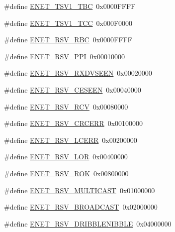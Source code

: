 \begin{DoxyCompactItemize}
\item 
\#define \hyperlink{group___e_n_e_t__17_x_x__40_x_x_ga85659c24bcb857d841bc18e037ee3a78}{E\+N\+E\+T\+\_\+\+T\+S\+V1\+\_\+\+T\+B\+C}~0x0000\+F\+F\+F\+F
\item 
\#define \hyperlink{group___e_n_e_t__17_x_x__40_x_x_ga9a2d8f8be313560a8d1858f623d5d599}{E\+N\+E\+T\+\_\+\+T\+S\+V1\+\_\+\+T\+C\+C}~0x000\+F0000
\item 
\#define \hyperlink{group___e_n_e_t__17_x_x__40_x_x_gabebe49780c8611118ce1596cf3d77436}{E\+N\+E\+T\+\_\+\+R\+S\+V\+\_\+\+R\+B\+C}~0x0000\+F\+F\+F\+F
\item 
\#define \hyperlink{group___e_n_e_t__17_x_x__40_x_x_gaa45464496eefb8f66d8281ceefe3b198}{E\+N\+E\+T\+\_\+\+R\+S\+V\+\_\+\+P\+P\+I}~0x00010000
\item 
\#define \hyperlink{group___e_n_e_t__17_x_x__40_x_x_ga96fe41c39224b433c1fe074b76161ec7}{E\+N\+E\+T\+\_\+\+R\+S\+V\+\_\+\+R\+X\+D\+V\+S\+E\+E\+N}~0x00020000
\item 
\#define \hyperlink{group___e_n_e_t__17_x_x__40_x_x_ga32813050731261f0abb8a938a49db29d}{E\+N\+E\+T\+\_\+\+R\+S\+V\+\_\+\+C\+E\+S\+E\+E\+N}~0x00040000
\item 
\#define \hyperlink{group___e_n_e_t__17_x_x__40_x_x_gac21ffe7a15a96229eb770a7f1dcdb7dd}{E\+N\+E\+T\+\_\+\+R\+S\+V\+\_\+\+R\+C\+V}~0x00080000
\item 
\#define \hyperlink{group___e_n_e_t__17_x_x__40_x_x_ga7481775906d508f6a529b46520e58a97}{E\+N\+E\+T\+\_\+\+R\+S\+V\+\_\+\+C\+R\+C\+E\+R\+R}~0x00100000
\item 
\#define \hyperlink{group___e_n_e_t__17_x_x__40_x_x_gafadac62e2e18ad75a244e4227509931d}{E\+N\+E\+T\+\_\+\+R\+S\+V\+\_\+\+L\+C\+E\+R\+R}~0x00200000
\item 
\#define \hyperlink{group___e_n_e_t__17_x_x__40_x_x_gaae8c1aa30582b7a66657c78b54bcf43a}{E\+N\+E\+T\+\_\+\+R\+S\+V\+\_\+\+L\+O\+R}~0x00400000
\item 
\#define \hyperlink{group___e_n_e_t__17_x_x__40_x_x_ga32032cd510a057a50e4e08acf50ddcde}{E\+N\+E\+T\+\_\+\+R\+S\+V\+\_\+\+R\+O\+K}~0x00800000
\item 
\#define \hyperlink{group___e_n_e_t__17_x_x__40_x_x_gaf0bd8c3446555f296b06d4865c8cb6cd}{E\+N\+E\+T\+\_\+\+R\+S\+V\+\_\+\+M\+U\+L\+T\+I\+C\+A\+S\+T}~0x01000000
\item 
\#define \hyperlink{group___e_n_e_t__17_x_x__40_x_x_ga87f8e1929545347ff2ddd8ee658ef54b}{E\+N\+E\+T\+\_\+\+R\+S\+V\+\_\+\+B\+R\+O\+A\+D\+C\+A\+S\+T}~0x02000000
\item 
\#define \hyperlink{group___e_n_e_t__17_x_x__40_x_x_ga5c2ebce59acc2a9ca4e4569bcc6290ca}{E\+N\+E\+T\+\_\+\+R\+S\+V\+\_\+\+D\+R\+I\+B\+B\+L\+E\+N\+I\+B\+B\+L\+E}~0x04000000

\end{DoxyCompactItemize}
